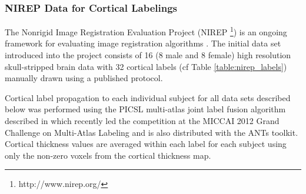 %
%

\subsubsection{NIREP Data for Cortical Labelings}

The Nonrigid Image Registration Evaluation Project (NIREP%
\footnote{
http://www.nirep.org/
}) 
is an ongoing framework for evaluating image registration algorithms \citep{christensen2006}.
The initial data set introduced into the project consists of 
16 (8 male and 8 female) high resolution skull-stripped brain 
data with 32 cortical labels (cf Table \ref{table:nirep_labels}) manually drawn using a 
published protocol.

Cortical label propagation to each individual subject for all data sets
described below was performed using the PICSL multi-atlas joint label fusion
algorithm described in \cite{wang2013} which recently led the competition
at the MICCAI 2012 Grand Challenge on Multi-Atlas Labeling and is also 
distributed with the ANTs toolkit.  Cortical thickness values are averaged
within each label for each subject using only the non-zero voxels from the cortical thickness map.

